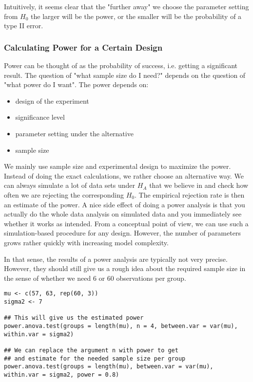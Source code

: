 Intuitively, it seems clear that the "further away" we choose the parameter setting from $H_0$ the larger will be the power, or the smaller will be the probability of a type II error.

\subsubsection{Calculating Power for a Certain Design}

Power can be thought of as the probability of success, i.e. getting a significant result. The question of "what sample size do I need?" depends on the question of "what power do I want". The power depends on:
\begin{itemize}
	\item design of the experiment
	\item significance level
	\item parameter setting under the alternative
	\item sample size
\end{itemize}

We mainly use sample size and experimental design to maximize the power. Instead of doing the exact calculations, we rather choose an alternative way. We can always simulate a lot of data sets under $H_A$ that we believe in and check how often we are rejecting the corresponding $H_0$. The empirical rejection rate is then an estimate of the power. A nice side effect of doing a power analysis is that you actually do the whole data analysis on simulated data and you immediately see whether it works as intended. From a conceptual point of view, we can use such a simulation-based procedure for any design. However, the number of parameters grows rather quickly with increasing model complexity. \medskip

In that sense, the results of a power analysis are typically not very precise. However, they should still give us a rough idea about the required sample size in the sense of whether we need 6 or 60 observations per group.

\begin{lstlisting}
mu <- c(57, 63, rep(60, 3)) 
sigma2 <- 7 

## This will give us the estimated power
power.anova.test(groups = length(mu), n = 4, between.var = var(mu), within.var = sigma2)

## We can replace the argument n with power to get 
## and estimate for the needed sample size per group
power.anova.test(groups = length(mu), between.var = var(mu), within.var = sigma2, power = 0.8)
\end{lstlisting}

